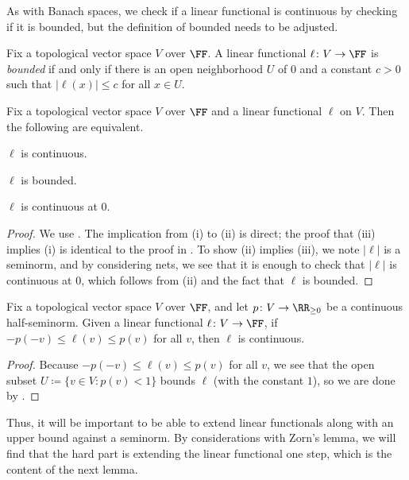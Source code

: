 \documentclass[notes.tex]{subfiles}
\begin{document}
As with Banach spaces, we check if a linear functional is continuous by checking if it is bounded, but the definition of bounded needs to be adjusted.
\begin{definition}[bounded]
	Fix a topological vector space $V$ over $\FF$. A linear functional $\ell\colon V\to\FF$ is \textit{bounded} if and only if there is an open neighborhood $U$ of $0$ and a constant $c>0$ such that $\left|\ell(x)\right|\le c$ for all $x\in U$.
\end{definition}
\begin{lemma} \label{lem:linear-func-cont-grab-bag}
	Fix a topological vector space $V$ over $\FF$ and a linear functional $\ell$ on $V$. Then the following are equivalent.
	\begin{listroman}
		\item $\ell$ is continuous.
		\item $\ell$ is bounded.
		\item $\ell$ is continuous at $0$.
	\end{listroman}
\end{lemma}
\begin{proof}
	We use . The implication from (i) to (ii) is direct; the proof that (iii) implies (i) is identical to the proof in . To show (ii) implies (iii), we note $\left|\ell\right|$ is a seminorm, and by considering nets, we see that it is enough to check that $\left|\ell\right|$ is continuous at $0$, which follows from (ii) and the fact that $\ell$ is bounded.
\end{proof}
\begin{corollary} \label{cor:functional-check-continuity}
	Fix a topological vector space $V$ over $\FF$, and let $p\colon V\to\RR_{\ge0}$ be a continuous half-seminorm. Given a linear functional $\ell\colon V\to\FF$, if $-p(-v)\le\ell(v)\le p(v)$ for all $v$, then $\ell$ is continuous.
\end{corollary}
\begin{proof}
	Because $-p(-v)\le\ell(v)\le p(v)$ for all $v$, we see that the open subset $U\coloneqq\{v\in V:p(v)<1\}$ bounds $\ell$ (with the constant $1$), so we are done by .
\end{proof}
Thus, it will be important to be able to extend linear functionals along with an upper bound against a seminorm. By considerations with Zorn's lemma, we will find that the hard part is extending the linear functional one step, which is the content of the next lemma.
\end{document}
